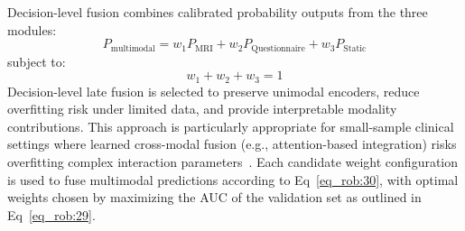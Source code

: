 \documentclass[10pt,letterpaper]{article}
\begin{document}
                                                                                                                  Decision-level fusion combines calibrated probability outputs from the three modules:
                                                                                                                  \begin{equation} \label{eq_rob:29}
                                                                                                                  P_{\text{multimodal}} = w_1 P_{\text{MRI}} + w_2 P_{\text{Questionnaire}} + w_3 P_{\text{Static}}
                                                                                                                  \end{equation}
                                                                                                                  subject to:
                                                                                                                  \begin{equation} \label{eq_rob:30}
                                                                                                                  w_1+w_2+w_3=1
                                                                                                                  \end{equation}
                                                                                                                  Decision-level late fusion is selected to preserve unimodal encoders, reduce overfitting risk under limited data, and provide interpretable modality contributions. This approach is particularly appropriate for small-sample clinical settings where learned cross-modal fusion (e.g., attention-based integration) risks overfitting complex interaction parameters~\cite{ref47}. Each candidate weight configuration is used to fuse multimodal predictions according to Eq~\eqref{eq_rob:30}, with optimal weights chosen by maximizing the AUC of the validation set as outlined in Eq~\eqref{eq_rob:29}.
\end{document}
